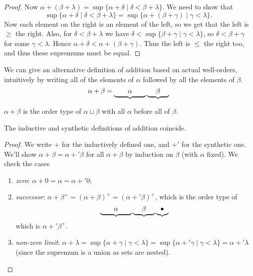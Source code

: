 \documentclass[a3paper, 10pt]{article}
\begin{document}
\begin{multicols*}{5}
\begin{proof}
Now $\alpha + (\beta + \lambda) = \sup\{\alpha + \delta \mid \delta < \beta + \lambda\}$.
We need to show that 
$$\sup\{\alpha + \delta \mid \delta < \beta +\lambda\} = \sup \{\alpha + (\beta + \gamma) \mid \gamma < \lambda\}.
$$
Now each element on the right is an element of the left, so we get that the left is $\geq$ the right. Also, for $\delta < \beta + \lambda$ we have $\delta < \sup \{\beta + \gamma \mid \gamma < \lambda\}$, so $\delta < \beta + \gamma$ for some $\gamma < \lambda$. Hence $\alpha + \delta < \alpha + (\beta + \gamma)$. Thus the left is $\leq$ the right too, and thus these supremums must be equal.
\end{proof}

We can give an alternative definition of addition based on actual well-orders, intuitively by writing all of the elements of $\alpha$ followed by all the elements of $\beta$.
\[
  \alpha + \beta = \underbrace{\quad\quad\vphantom{\beta}\alpha\vphantom{\beta}\quad\quad}\underbrace{\quad\;\beta\;\quad}
\]
\begin{definition}
  $\alpha + \beta$ is the order type of $\alpha \sqcup \beta$ with all $\alpha$ before all of $\beta$.
\end{definition}

\begin{proposition}
  The inductive and synthetic definitions of addition coincide.
\end{proposition}
\begin{proof}
We write $+$ for the inductively defined one, and $+'$ for the synthetic one. We'll show $\alpha + \beta = \alpha +' \beta$ for all $\alpha + \beta$ by induction on $\beta$ (with $\alpha$ fixed). We check the cases
\begin{enumerate}
  \item \emph{zero}: $\alpha + 0 = \alpha = \alpha +' 0$;
  \item \emph{successor}: $\alpha + \beta^+ = (\alpha + \beta)^+ = (\alpha +' \beta)^+$, which is the order type of 
  $$
  \underbrace{\quad\quad\vphantom{\beta}\alpha\vphantom{\beta}\quad\quad}\underbrace{\quad\;\beta\;\quad}
  \underbrace{\vphantom{\beta}\bullet\vphantom{\beta}}
  $$ 
  which is $\alpha +' \beta^+$.
  \item \emph{non-zero limit}: $\alpha + \lambda = \sup\{\alpha + \gamma \mid \gamma < \lambda\} = \sup\{\alpha +' \gamma \mid \gamma < \lambda\} = \alpha +' \lambda$ (since the supremum is a union as sets are nested).
\end{enumerate}\vspace{-1pc}
\end{proof}


\end{multicols*}
\end{document}
